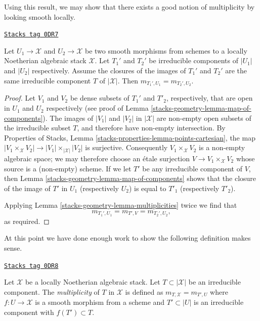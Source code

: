 Using this result, we may show that there exists a good notion
of multiplicity by looking smooth locally.

\begin{lemma}[Multiplicity]
\label{stacks-geometry-lemma-multiplicity}
\href{https://stacks.math.columbia.edu/tag/0DR7}{\texttt{Stacks tag 0DR7}}

Let $U_1 \to \mathcal{X}$ and $U_2 \to \mathcal{X}$ be two smooth
morphisms from schemes to a locally Noetherian algebraic stack $\mathcal{X}$.
Let $T_1'$ and $T_2'$ be irreducible components of $|U_1|$
and $|U_2|$ respectively. Assume the closures of the images of
$T_1'$ and $T_2'$ are the same irreducible component $T$ of $|\mathcal{X}|$.
Then $m_{T_1', U_1} = m_{T_2', U_2}$.
\end{lemma}

\begin{proof}
Let $V_1$ and $V_2$ be dense subsets of $T_1'$ and $T'_2$, respectively,
that are open in $U_1$ and $U_2$ respectively (see proof of
Lemma \ref{stacks-geometry-lemma-map-of-components}).
The images of $|V_1|$ and $|V_2|$ in $|\mathcal{X}|$ are non-empty open
subsets of the irreducible subset $T$, and therefore have non-empty
intersection. By
Properties of Stacks, Lemma \ref{stacks-properties-lemma-points-cartesian},
the map $|V_1 \times_\mathcal{X} V_2| \to |V_1| \times_{|\mathcal{X}|} |V_2|$
is surjective. Consequently $V_1 \times_\mathcal{X} V_2$
is a non-empty algebraic space; we may therefore choose an
\'etale surjection $V \to V_1 \times_\mathcal{X} V_2$
whose source is a (non-empty) scheme.
If we let $T'$ be any irreducible component of $V$,
then Lemma \ref{stacks-geometry-lemma-map-of-components} shows that the closure of
the image of $T'$ in $U_1$ (respectively $U_2$) is equal to $T'_1$
(respectively $T'_2$).

\medskip\noindent
Applying Lemma \ref{stacks-geometry-lemma-multiplicities} twice we find
that
$$
m_{T_1', U_1} = m_{T', V} = m_{T_2', U_2},
$$
as required.
\end{proof}

At this point we have done enough work to show the following
definition makes sense.

\begin{definition}[Multiplicity]
\label{stacks-geometry-definition-multiplicity}
\href{https://stacks.math.columbia.edu/tag/0DR8}{\texttt{Stacks tag 0DR8}}

Let $\mathcal{X}$ be a locally Noetherian algebraic stack. Let
$T \subset |\mathcal{X}|$ be an irreducible component.
The {\it multiplicity} of $T$ in $\mathcal{X}$ is defined as
$m_{T, \mathcal{X}} = m_{T', U}$ where $f : U \to \mathcal{X}$
is a smooth morphism from a scheme and $T' \subset |U|$
is an irreducible component with $f(T') \subset T$.
\end{definition}

